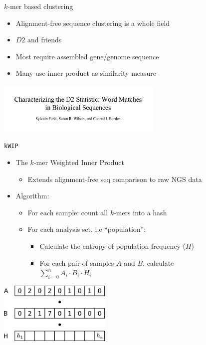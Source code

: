 \documentclass[t]{beamer}
\begin{document}
\begin{frame}{$k$-mer based clustering}
  \begin{itemize}
    \item Alignment-free sequence clustering is a whole field
    \item $D2$ and friends
    \item Most require assembled gene/genome sequence
    \item Many use inner product as similarity measure
  \end{itemize}
  \begin{center}
    \includegraphics[width=0.6\textwidth]{img/foret-et-al-d2.png}
  \end{center}
\end{frame}

\begin{frame}{\texttt{kWIP}}
  \begin{itemize}
    \item The $k$-mer Weighted Inner Product
      \begin{itemize}
        \item Extends alignment-free seq comparison to raw NGS data
      \end{itemize}
    \pause
    \item Algorithm:
      \begin{itemize}
        \item For each sample: count all $k$-mers into a hash
        \pause
        \item For each analysis set, i.e ``population'':
          \begin{itemize}
            \item Calculate the entropy of population frequency ($H$)
            \item For each pair of samples $A$ and $B$, calculate \\
              $\sum\limits^{n}_{i=0} A_i \cdot B_i \cdot H_i$
          \end{itemize}
      \end{itemize}
  \end{itemize}
  \begin{center}
    \includegraphics[width=0.4\textwidth]{img/hash-wip.png}
  \end{center}
\end{frame}
\end{document}
